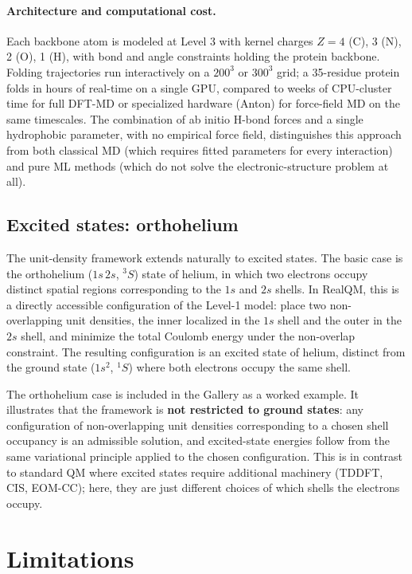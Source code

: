 \documentclass[11pt]{article}
\begin{document}
\paragraph{Architecture and computational cost.}
Each backbone atom is modeled at Level 3 with kernel charges $Z = 4$ (C), 3 (N), 2 (O), 1 (H), with bond and angle constraints holding the protein backbone. Folding trajectories run interactively on a $200^3$ or $300^3$ grid; a 35-residue protein folds in hours of real-time on a single GPU, compared to weeks of CPU-cluster time for full DFT-MD or specialized hardware (Anton) for force-field MD on the same timescales. The combination of ab initio H-bond forces and a single hydrophobic parameter, with no empirical force field, distinguishes this approach from both classical MD (which requires fitted parameters for every interaction) and pure ML methods (which do not solve the electronic-structure problem at all).

\subsection{Excited states: orthohelium}\label{sec:orthohelium}

The unit-density framework extends naturally to excited states. The basic case is the orthohelium ($1s\,2s$, $^3S$) state of helium, in which two electrons occupy distinct spatial regions corresponding to the $1s$ and $2s$ shells. In RealQM, this is a directly accessible configuration of the Level-1 model: place two non-overlapping unit densities, the inner localized in the $1s$ shell and the outer in the $2s$ shell, and minimize the total Coulomb energy under the non-overlap constraint. The resulting configuration is an excited state of helium, distinct from the ground state ($1s^2$, $^1S$) where both electrons occupy the same shell.

The orthohelium case is included in the Gallery as a worked example. It illustrates that the framework is \textbf{not restricted to ground states}: any configuration of non-overlapping unit densities corresponding to a chosen shell occupancy is an admissible solution, and excited-state energies follow from the same variational principle applied to the chosen configuration. This is in contrast to standard QM where excited states require additional machinery (TDDFT, CIS, EOM-CC); here, they are just different choices of which shells the electrons occupy.

\section{Limitations}\label{sec:limitations}
\end{document}
